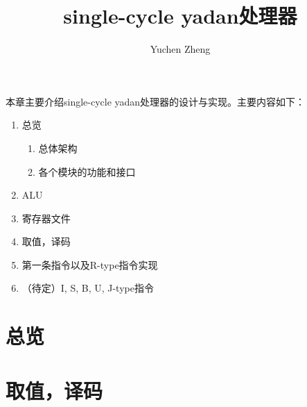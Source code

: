 \documentclass[UTF8]{ctexart}
\title{single-cycle yadan处理器}
\author{Yuchen Zheng}
\date{}
\begin{document}
\maketitle
本章主要介绍single-cycle yadan处理器的设计与实现。主要内容如下：
\begin{enumerate}
    \item 总览
    \begin{enumerate}
        \item 总体架构
        \item 各个模块的功能和接口
    \end{enumerate}
    \item ALU
    \item 寄存器文件
    \item 取值，译码
    \item 第一条指令以及R-type指令实现
    \item （待定）I, S, B, U, J-type指令
\end{enumerate}

\section{总览}

\section{取值，译码}
\end{document}
